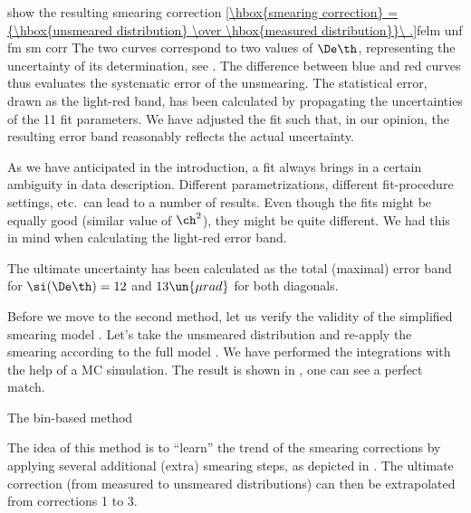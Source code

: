  show the resulting smearing correction
\eqref{\hbox{smearing correction} = {\hbox{unsmeared distribution} \over \hbox{measured distribution}}\ .}{felm unf fm sm corr}
The two curves correspond to two values of $\De\th$, representing the uncertainty of its determination, see . The difference between blue and red curves thus evaluates the systematic error of the unsmearing. The statistical error, drawn as the light-red band, has been calculated by propagating the uncertainties of the 11 fit parameters. We have adjusted the fit such that, in our opinion, the resulting error band reasonably reflects the actual uncertainty.

As we have anticipated in the introduction, a fit always brings in a certain ambiguity in data description. Different parametrizations, different fit-procedure settings, etc.~can lead to a number of results. Even though the fits might be equally good (similar value of $\ch^2$), they might be quite different. We had this in mind when calculating the light-red error band.

The ultimate uncertainty has been calculated as the total (maximal) error band for $\si(\De\th) = 12$ and $13\un{\mu rad}$ for both diagonals.

Before we move to the second method, let us verify the validity of the simplified smearing model . Let's take the unsmeared distribution and re-apply the smearing according to the full model . We have performed the integrations with the help of a MC simulation. The result is shown in , one can see a perfect match.


\caption{The bin-based method}

The idea of this method is to ``learn'' the trend of the smearing corrections by applying several additional (extra) smearing steps, as depicted in . The ultimate correction (from measured to unsmeared distributions) can then be extrapolated from corrections 1 to 3.


